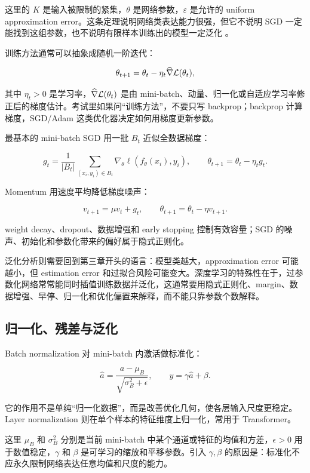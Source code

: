 \documentclass[11pt]{ctexart}
\begin{document}
这里的 \(K\) 是输入被限制的紧集，\(\theta\) 是网络参数，\(\varepsilon\) 是允许的 uniform approximation error。这条定理说明网络类表达能力很强，但它不说明 SGD 一定能找到这组参数，也不说明有限样本训练出的模型一定泛化 \parencite{goodfellow2016deep,bishop2023deep}。

训练方法通常可以抽象成随机一阶迭代：

\[
  \theta_{t+1}
  =
  \theta_t-\eta_t \widehat{\nabla}\mathcal{L}(\theta_t),
\]

其中 \(\eta_t>0\) 是学习率，\(\widehat{\nabla}\mathcal{L}(\theta_t)\) 是由 mini-batch、动量、归一化或自适应学习率修正后的梯度估计。考试里如果问“训练方法”，不要只写 backprop；backprop 计算梯度，SGD/Adam 这类优化器决定如何用梯度更新参数。

最基本的 mini-batch SGD 用一批 \(B_t\) 近似全数据梯度：

\[
  g_t=\frac{1}{|B_t|}\sum_{(x_i,y_i)\in B_t}\nabla_\theta\ell(f_\theta(x_i),y_i),
  \qquad
  \theta_{t+1}=\theta_t-\eta_t g_t.
\]

Momentum 用速度平均降低梯度噪声：

\[
  v_{t+1}=\mu v_t+g_t,
  \qquad
  \theta_{t+1}=\theta_t-\eta v_{t+1}.
\]

weight decay、dropout、数据增强和 early stopping 控制有效容量；SGD 的噪声、初始化和参数化带来的偏好属于隐式正则化。

泛化分析则需要回到第三章开头的语言：模型类越大，approximation error 可能越小，但 estimation error 和过拟合风险可能变大。深度学习的特殊性在于，过参数化网络常常能同时插值训练数据并泛化，这通常要用隐式正则化、margin、数据增强、早停、归一化和优化偏置来解释，而不能只靠参数个数解释。

\subsection{归一化、残差与泛化}

Batch normalization 对 mini-batch 内激活做标准化：

\[
  \widehat a
  =
  \frac{a-\mu_B}{\sqrt{\sigma_B^2+\epsilon}},
  \qquad
  y=\gamma \widehat a+\beta.
\]

它的作用不是单纯“归一化数据”，而是改善优化几何，使各层输入尺度更稳定。Layer normalization 则在单个样本的特征维度上归一化，常用于 Transformer。

这里 \(\mu_B\) 和 \(\sigma_B^2\) 分别是当前 mini-batch 中某个通道或特征的均值和方差，\(\epsilon>0\) 用于数值稳定，\(\gamma\) 和 \(\beta\) 是可学习的缩放和平移参数。引入 \(\gamma,\beta\) 的原因是：标准化不应永久限制网络表达任意均值和尺度的能力。
\end{document}
